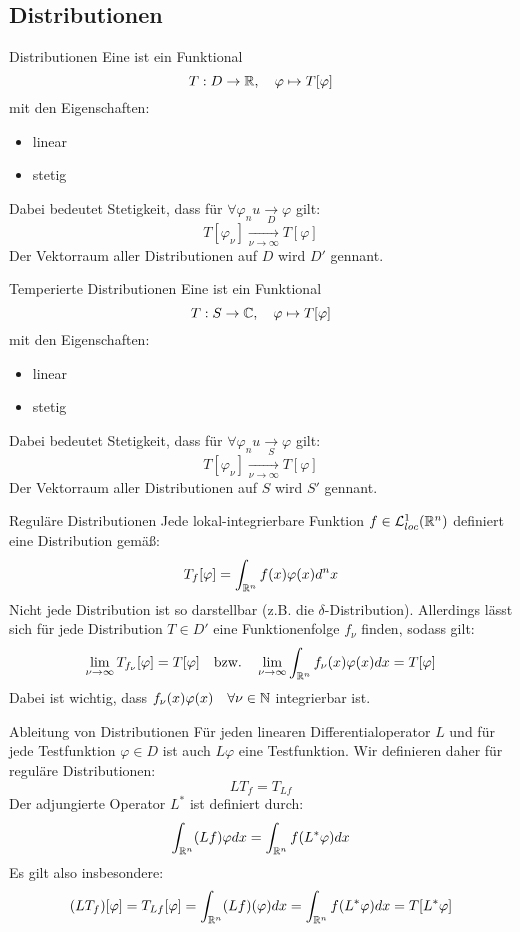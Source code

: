 \subsection{Distributionen}
\begin{Def}{Distributionen}
    Eine  ist ein Funktional
    $$T: D\rightarrow \mathbb{R}, \quad \varphi\mapsto T[\varphi]$$
    mit den Eigenschaften:
    \begin{itemize}
        \item linear
        \item stetig
    \end{itemize}
    Dabei bedeutet Stetigkeit, dass für $\forall \varphi_nu \underset{D}{\rightarrow}\varphi$ gilt:
    $$T[\varphi_\nu]\underset{\nu\rightarrow\infty}{\rightarrow}T[\varphi]$$
    Der Vektorraum aller Distributionen auf $D$ wird $D'$ gennant.
\end{Def}
\begin{Def}{Temperierte Distributionen}
    Eine  ist ein Funktional
    $$T:S\rightarrow \mathbb{C}, \quad \varphi\mapsto T[\varphi]$$
    mit den Eigenschaften:
        \begin{itemize}
        \item linear
        \item stetig
    \end{itemize}
    Dabei bedeutet Stetigkeit, dass für $\forall \varphi_nu \underset{S}{\rightarrow}\varphi$ gilt:
    $$T[\varphi_\nu]\underset{\nu\rightarrow\infty}{\rightarrow}T[\varphi]$$
       Der Vektorraum aller Distributionen auf $S$ wird $S'$ gennant.
\end{Def}
\begin{Def}{Reguläre Distributionen}
Jede lokal-integrierbare Funktion $f\in \mathcal{L}^1_{loc}(\mathbb{R}^n)$ definiert eine Distribution gemäß:
$$T_f[\varphi]=\int_{\mathbb{R}^n}f(x)\varphi(x)d^n x$$
Nicht jede Distribution ist so darstellbar (z.B. die $\delta$-Distribution). Allerdings lässt sich für jede Distribution $T\in D'$ eine Funktionenfolge $f_\nu$ finden, sodass gilt:
$$\lim_{\nu \rightarrow \infty} T_{f_\nu}[\varphi]=T[\varphi] \quad \text{bzw.} \quad \lim_{\nu\rightarrow \infty}\int_{\mathbb{R}^n}f_\nu(x)\varphi(x)dx=T[\varphi]$$
Dabei ist wichtig, dass $f_\nu(x)\varphi(x) \quad \forall \nu \in \mathbb{N}$ integrierbar ist.
\end{Def}
\begin{Def}{Ableitung von Distributionen}
Für jeden linearen Differentialoperator $L$ und für jede Testfunktion $\varphi\in D$ ist auch $L\varphi$ eine Testfunktion. Wir definieren daher für reguläre Distributionen:
$$LT_f=T_{Lf}$$
Der adjungierte Operator $L^*$ ist definiert durch:
$$\int_{\mathbb{R}^n}(Lf)\varphi dx = \int_{\mathbb{R}^n}f(L^*\varphi)dx$$
Es gilt also insbesondere:
$$(LT_f)[\varphi]=T_{Lf}[\varphi]=\int_{\mathbb{R}^n}(Lf)(\varphi)dx=\int_{\mathbb{R}^n}f(L^*\varphi)dx = T[L^* \varphi]$$
\end{Def}
